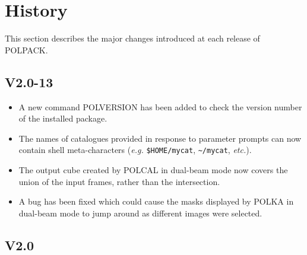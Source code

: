 \documentclass[twoside,11pt]{article}
\newcommand{\htmlref}[2]{#1}
\renewcommand{\_}{\texttt{\symbol{95}}}
\begin{document}
\section{\label{APP:HISTORY}History}
This section describes the major changes introduced at each release of
POLPACK.
\subsection{V2.0-13}

\begin{itemize}

\item A new command \htmlref{POLVERSION}{POLVERSION} has been added to check
the version number of the installed package.

\item The names of catalogues provided in response to parameter prompts 
can now contain shell meta-characters (\emph{e.g.} \verb+$HOME/mycat+, 
\verb+~/mycat+, \emph{etc.}).

\item The output cube created by POLCAL in dual-beam mode now covers the
union of the input frames, rather than the intersection.

\item A bug has been fixed which could cause the masks displayed by POLKA 
in dual-beam mode to jump around as different images were selected.

\end{itemize}

\subsection{V2.0}
\end{document}
